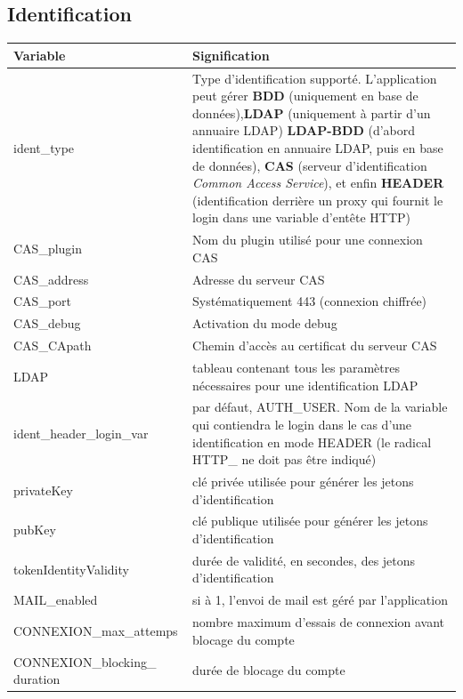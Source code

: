 \subsection{Identification}\label{paramident}
\begin{longtable}{|p{5cm}|p{8cm}|}
\hline
\textbf{Variable} & \textbf{Signification} \\
\hline
\endhead
ident\_type & Type d'identification supporté. L'application peut gérer \textbf{BDD} (uniquement en base de données),\textbf{LDAP} (uniquement à partir d'un annuaire LDAP) \textbf{LDAP-BDD} (d'abord identification en annuaire LDAP, puis en base de données), \textbf{CAS} (serveur d'identification \textit{Common Access Service}), et enfin \textbf{HEADER} (identification derrière un proxy qui fournit le login dans une variable d'entête HTTP)\\
CAS\_plugin & Nom du plugin utilisé pour une connexion CAS \\
CAS\_address & Adresse du serveur CAS\\
CAS\_port & Systématiquement 443 (connexion chiffrée)\\
CAS\_debug & Activation du mode debug \\
CAS\_CApath & Chemin d'accès au certificat du serveur CAS \\
LDAP & tableau contenant tous les paramètres nécessaires pour une identification LDAP \\
ident\_header\_login\_var & par défaut, AUTH\_USER. Nom de la variable qui contiendra le login dans le cas d'une identification en mode HEADER (le radical HTTP\_  ne doit pas être indiqué) \\

privateKey & clé privée utilisée pour générer les jetons d'identification \\

pubKey & clé publique utilisée pour générer les jetons d'identification \\

tokenIdentityValidity & durée de validité, en secondes, des jetons d'identification\\

MAIL\_enabled & si à 1, l'envoi de mail est géré par l'application \\

CONNEXION\_max\_attemps & nombre maximum d'essais de connexion avant blocage du compte \\

CONNEXION\_blocking\_ duration & durée de blocage du compte \\


\end{longtable}
